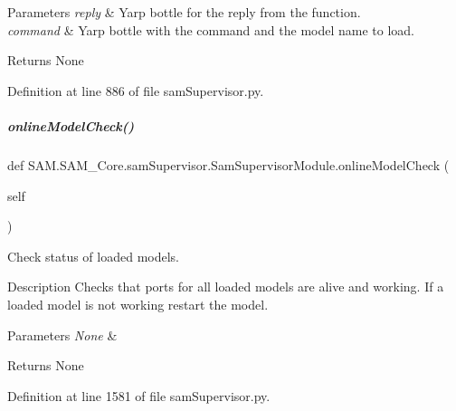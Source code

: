 \begin{DoxyParams}{Parameters}
{\em reply} & Yarp bottle for the reply from the function. \\
\hline
{\em command} & Yarp bottle with the command and the model name to load.\\
\hline
\end{DoxyParams}
\begin{DoxyParagraph}{Returns}
None 
\end{DoxyParagraph}


Definition at line 886 of file sam\+Supervisor.\+py.

\mbox{\label{group__icubclient__SAM__Core_a6d4be201af180a4de3489d2602419ec6}} 
\subparagraph{\texorpdfstring{online\+Model\+Check()}{onlineModelCheck()}}
{\footnotesize\ttfamily def S\+A\+M.\+S\+A\+M\+\_\+\+Core.\+sam\+Supervisor.\+Sam\+Supervisor\+Module.\+online\+Model\+Check (\begin{DoxyParamCaption}\item[{}]{self }\end{DoxyParamCaption})}



Check status of loaded models. 

\begin{DoxyParagraph}{Description}
Checks that ports for all loaded models are alive and working. If a loaded model is not working restart the model.
\end{DoxyParagraph}

\begin{DoxyParams}{Parameters}
{\em None} & \\
\hline
\end{DoxyParams}
\begin{DoxyParagraph}{Returns}
None 
\end{DoxyParagraph}


Definition at line 1581 of file sam\+Supervisor.\+py.


